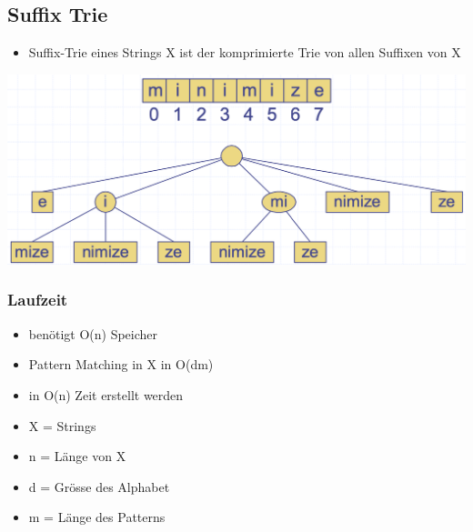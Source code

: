 \subsection{Suffix Trie}
\begin{itemize}
    \item Suffix-Trie eines Strings X ist der komprimierte Trie von allen Suffixen von X
\end{itemize}
\vspace{-8pt}
\begin{center}
    \includegraphics[scale=0.25]{graphic/09 Tries/Suffix.png}
\end{center}
\vspace{-8pt}
\subsubsection{Laufzeit}
\begin{itemize}
    \item benötigt O(n) Speicher
    \item Pattern Matching in X in O(dm)
    \item in O(n) Zeit erstellt werden
    \item X = Strings
    \item n = Länge von X
    \item d = Grösse des Alphabet
    \item m = Länge des Patterns
\end{itemize}

\vfill
$ $
\columnbreak



\newpage